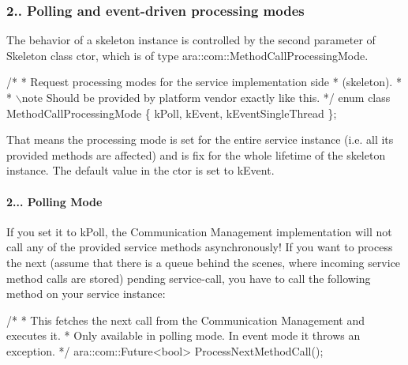 \subsubsection*{2.. Polling and event-\/driven processing modes}


\begin{DoxyItemize}
\item The behavior of a skeleton instance is controlled by the second parameter of Skeleton class ctor, which is of type ara\+::com\+::\+Method\+Call\+Processing\+Mode.
\end{DoxyItemize}


\begin{DoxyCode}
\textcolor{comment}{/*}
\textcolor{comment}{* Request processing modes for the service implementation side}
\textcolor{comment}{* (skeleton).}
\textcolor{comment}{*}
\textcolor{comment}{* \(\backslash\)note Should be provided by platform vendor exactly like this.}
\textcolor{comment}{*/}
\textcolor{keyword}{enum class} MethodCallProcessingMode \{ kPoll, kEvent, kEventSingleThread \};
\end{DoxyCode}

\begin{DoxyItemize}
\item That means the processing mode is set for the entire service instance (i.\+e. all its provided methods are affected) and is fix for the whole lifetime of the skeleton instance. The default value in the ctor is set to k\+Event.
\end{DoxyItemize}

\paragraph*{2... Polling Mode}


\begin{DoxyItemize}
\item If you set it to k\+Poll, the Communication Management implementation will not call any of the provided service methods asynchronously! If you want to process the next (assume that there is a queue behind the scenes, where incoming service method calls are stored) pending service-\/call, you have to call the following method on your service instance\+:
\end{DoxyItemize}


\begin{DoxyCode}
\textcolor{comment}{/*}
\textcolor{comment}{* This fetches the next call from the Communication Management and executes it.}
\textcolor{comment}{* Only available in polling mode. In event mode it throws an exception.}
\textcolor{comment}{*/}
ara::com::Future<bool> ProcessNextMethodCall();
\end{DoxyCode}

